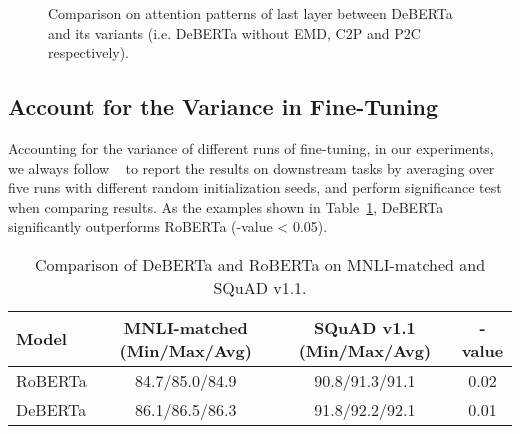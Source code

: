 \documentclass{article}
\begin{document}
\clearpage

\begin{figure}[htb!]
\centering 
{}
\vfill
{}
\vfill
{}
\caption{Comparison  on attention patterns of last layer between DeBERTa and its variants (i.e. DeBERTa without EMD, C2P and P2C respectively).}
\label{fig:att}
\end{figure}


\subsection{Account for the Variance in Fine-Tuning}
Accounting for the variance of different runs of fine-tuning, in our experiments, we always follow ~\cite{liu2019roberta} to report the results on downstream tasks by averaging over five runs with different random initialization seeds, and perform significance test when comparing results.  
As the examples shown in Table~\ref{tab:var}, DeBERTa significantly outperforms RoBERTa (-value < 0.05).

\begin{table}[ht]
    \centering
    \begin{tabular}{l | c | c | c}
    \toprule
    Model & MNLI-matched (Min/Max/Avg)&  SQuAD v1.1 (Min/Max/Avg) & -value\\ \hline
    RoBERTa &84.7/85.0/84.9 &90.8/91.3/91.1 & 0.02\\ \hline      
    DeBERTa &86.1/86.5/86.3 &91.8/92.2/92.1 & 0.01\\
    \bottomrule
    \end{tabular}
    \caption{Comparison of DeBERTa and RoBERTa on MNLI-matched and SQuAD v1.1. }
    \label{tab:var}
\end{table}



 
\end{document}
